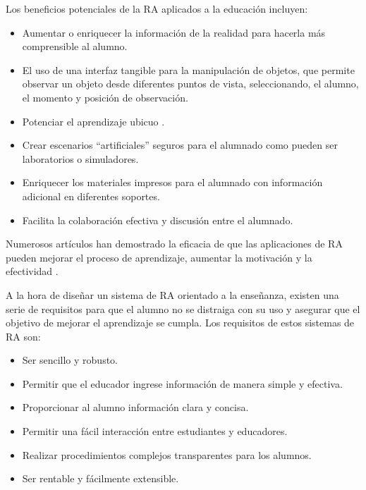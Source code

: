 Los beneficios potenciales de la RA aplicados a la educación incluyen:
\begin{itemize}

    \item Aumentar o enriquecer la información de la realidad para hacerla más comprensible al alumno.
    

    \item El uso de una interfaz tangible para la manipulación de objetos, que permite observar un objeto desde diferentes puntos de vista,
    seleccionando, el alumno, el momento y posición de observación.

    \item Potenciar el aprendizaje ubicuo \cite{URL::AprendizajeUbicuo}.
    
    \item Crear escenarios ``artificiales'' seguros para el alumnado
    como pueden ser laboratorios o simuladores. 

    \item Enriquecer los materiales impresos para el alumnado con información adicional en diferentes soportes.
    
    \item Facilita la colaboración efectiva y discusión entre el alumnado.
    
\end{itemize}

Numerosos artículos han demostrado la eficacia de que las aplicaciones de RA pueden mejorar el proceso de aprendizaje, aumentar la motivación y la efectividad \cite{URL::animationeco} \cite{URL::ar2}. 

A la hora de diseñar un sistema de RA orientado a la enseñanza, existen una serie de requisitos para que el alumno no se distraiga con su uso y asegurar que el objetivo de mejorar el aprendizaje se cumpla. Los requisitos de estos sistemas de RA son:

\begin{itemize}
    \item Ser sencillo y robusto.
    \item Permitir que el educador ingrese información de manera simple y efectiva.
    \item Proporcionar al alumno información clara y concisa.
    \item Permitir una fácil interacción entre estudiantes y educadores.
    \item Realizar procedimientos complejos transparentes para los alumnos.
    \item Ser rentable y fácilmente extensible.
\end{itemize}

